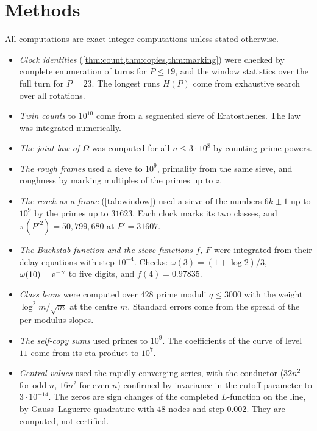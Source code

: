 \documentclass[11pt]{article}
\theoremstyle{definition}\newtheorem{definition}[theorem]{Definition}
\theoremstyle{remark}\newtheorem{remark}[theorem]{Remark}
\begin{document}
\section{Methods}\label{sec:methods}
All computations are exact integer computations unless stated otherwise.
\begin{itemize}
\item \emph{Clock identities} (\cref{thm:count,thm:copies,thm:marking}) were checked by complete enumeration of turns for $P\le19$, and the window statistics over the full turn for $P=23$. The longest runs $H(P)$ come from exhaustive search over all rotations.
\item \emph{Twin counts} to $10^{10}$ come from a segmented sieve of Eratosthenes. The law was integrated numerically.
\item \emph{The joint law of $\Omega$} was computed for all $n\le3\cdot10^8$ by counting prime powers.
\item \emph{The rough frames} used a sieve to $10^9$, primality from the same sieve, and roughness by marking multiples of the primes up to $z$.
\item \emph{The reach as a frame} (\cref{tab:window}) used a sieve of the numbers $6k\pm1$ up to $10^9$ by the primes up to $31623$. Each clock marks its two classes, and $\pi(P'^2)=50{,}799{,}680$ at $P'=31607$.
\item \emph{The Buchstab function and the sieve functions $f$, $F$} were integrated from their delay equations with step $10^{-4}$. Checks: $\omega(3)=(1+\log2)/3$, $\omega(10)=\mathrm e^{-\gamma}$ to five digits, and $f(4)=0.97835$.
\item \emph{Class leans} were computed over $428$ prime moduli $q\le3000$ with the weight $\log^2m/\sqrt m$ at the centre $m$. Standard errors come from the spread of the per-modulus slopes.
\item \emph{The self-copy sums} used primes to $10^9$. The coefficients of the curve of level $11$ come from its eta product to $10^7$.
\item \emph{Central values} used the rapidly converging series, with the conductor ($32n^2$ for odd $n$, $16n^2$ for even $n$) confirmed by invariance in the cutoff parameter to $3\cdot10^{-14}$. The zeros are sign changes of the completed $L$-function on the line, by Gauss--Laguerre quadrature with $48$ nodes and step $0.002$. They are computed, not certified.
\end{itemize}
\end{document}
